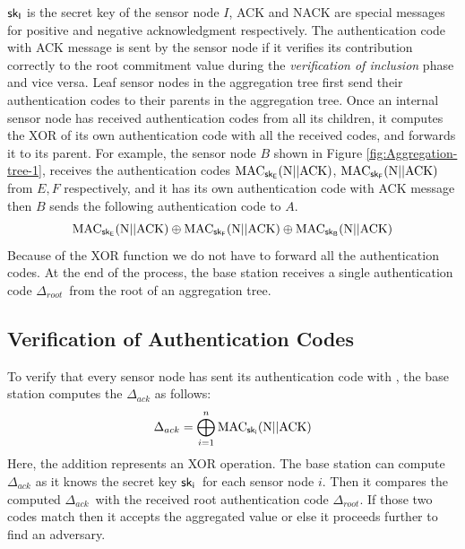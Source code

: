 		$\sf{sk}_{I}$ is the secret key of the sensor node $I$, ACK and NACK are special messages for positive and negative acknowledgment respectively.
		The authentication code with ACK message is sent by the sensor node if it verifies its contribution correctly to the root commitment value during the \textit{verification of inclusion} phase and vice versa.
		Leaf sensor nodes in the aggregation tree first send their authentication codes to their parents in the aggregation tree.
		Once an internal sensor node has received authentication codes from all its children, it computes the XOR of its own authentication code with all the received codes, and forwards it to its parent.
		For example, the sensor node $B$ shown in Figure \ref{fig:Aggregation-tree-1}, receives the authentication codes $\mbox{MAC}_{\sf{sk}_{E}}(\mbox{N}||\mbox{ACK})$, $\mbox{MAC}_{\sf{sk}_{F}}(\mbox{N}||\mbox{ACK})$ from $E,F$ respectively, and it has its own authentication code with ACK message then $B$ sends the following authentication code to $A$.
		\begin{equation*}
			\mbox{MAC}_{\sf{sk}_{E}}(\mbox{N}||\mbox{ACK}) \oplus \mbox{MAC}_{\sf{sk}_{F}}(\mbox{N}||\mbox{ACK}) \oplus \mbox{MAC}_{\sf{sk}_{B}}(\mbox{N}||\mbox{ACK})
		\end{equation*}
		Because of the XOR function we do not have to forward all the authentication codes. 
		At the end of the process, the base station receives a single authentication code $\Delta_{root}$\ from the root of an aggregation tree.

	\subsection{Verification of Authentication Codes}
		\label{sec:verficiation-of-authentication-codes}
		
		To verify that every sensor node has sent its authentication code with \ack, the base station computes the $\Delta_{ack}$ as follows:
		\begin{equation}
			\label{eq:mac-auth}
			\displaystyle{\Delta_{ack} = \bigoplus_{i = 1}^n \mbox{MAC}_{\sf{sk}_{i}}(\mbox{N} || \mbox{ACK}) }
		\end{equation}
		Here, the addition represents an XOR operation.
		The base station can compute $\Delta_{ack}$ as it knows the secret key $\sf{sk}_{i}$\ for each sensor node $i$.
		Then it compares the computed $\Delta_{ack}$\ with the received root authentication code $\Delta_{root}$. 
		If those two codes match then it accepts the aggregated value or else it proceeds further to find an adversary. 

